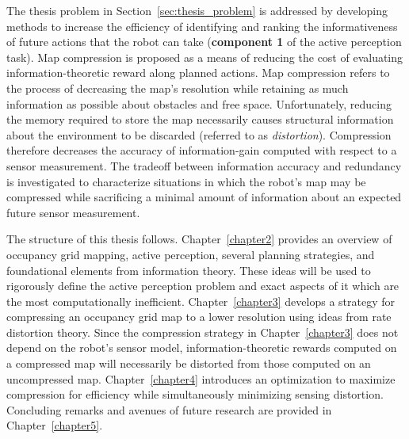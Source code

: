 The thesis problem in Section~\ref{sec:thesis_problem} is addressed by
developing methods to increase the efficiency of identifying and ranking
the informativeness of future actions that the robot can take ({\bf component
1} of the active perception task). Map compression is proposed as a means of reducing the cost of evaluating information-theoretic
reward along planned actions. Map compression refers to the process of
decreasing the map's resolution while retaining as much information as
possible about obstacles and free space. Unfortunately, reducing the memory required to
store the map necessarily causes structural information about the environment to
be discarded (referred to as \textit{distortion}). Compression therefore decreases the accuracy of information-gain
computed with respect to a sensor measurement. The tradeoff between information accuracy and
redundancy is investigated to characterize situations in which the robot's map may be
compressed while sacrificing a minimal amount of information about an expected
future sensor measurement.

The structure of this thesis follows. Chapter~\ref{chapter2} provides an
overview of occupancy grid mapping, active perception, several planning
strategies, and foundational elements from information theory. These ideas will
be used to rigorously define the active perception problem and exact aspects of
it which are the most computationally inefficient. Chapter~\ref{chapter3}
develops a strategy for compressing an occupancy grid map to a lower resolution
using ideas from rate distortion theory. Since the compression strategy
in Chapter~\ref{chapter3} does not depend on the robot's sensor model,
information-theoretic rewards computed on a compressed map will necessarily
be distorted from those computed on an uncompressed map. Chapter~\ref{chapter4}
introduces an optimization to maximize compression for efficiency while
simultaneously minimizing sensing distortion.
Concluding remarks and avenues of future research are provided in Chapter~\ref{chapter5}.

